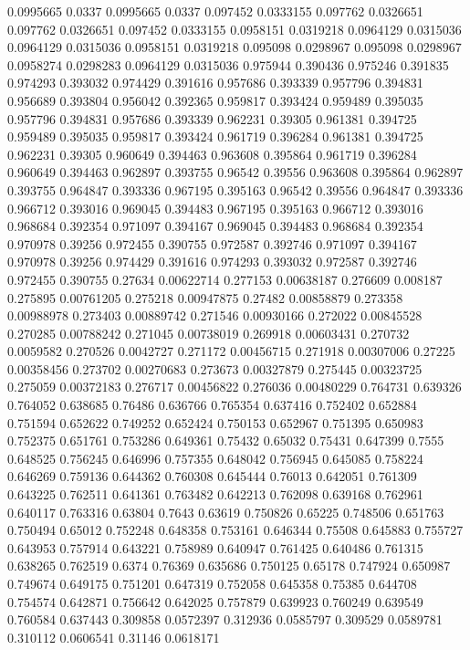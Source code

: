 0.0995665 0.0337
0.0995665 0.0337
0.097452 0.0333155
0.097762 0.0326651
0.097762 0.0326651
0.097452 0.0333155
0.0958151 0.0319218
0.0964129 0.0315036
0.0964129 0.0315036
0.0958151 0.0319218
0.095098 0.0298967
0.095098 0.0298967
0.0958274 0.0298283
0.0964129 0.0315036
0.975944 0.390436
0.975246 0.391835
0.974293 0.393032
0.974429 0.391616
0.957686 0.393339
0.957796 0.394831
0.956689 0.393804
0.956042 0.392365
0.959817 0.393424
0.959489 0.395035
0.957796 0.394831
0.957686 0.393339
0.962231 0.39305
0.961381 0.394725
0.959489 0.395035
0.959817 0.393424
0.961719 0.396284
0.961381 0.394725
0.962231 0.39305
0.960649 0.394463
0.963608 0.395864
0.961719 0.396284
0.960649 0.394463
0.962897 0.393755
0.96542 0.39556
0.963608 0.395864
0.962897 0.393755
0.964847 0.393336
0.967195 0.395163
0.96542 0.39556
0.964847 0.393336
0.966712 0.393016
0.969045 0.394483
0.967195 0.395163
0.966712 0.393016
0.968684 0.392354
0.971097 0.394167
0.969045 0.394483
0.968684 0.392354
0.970978 0.39256
0.972455 0.390755
0.972587 0.392746
0.971097 0.394167
0.970978 0.39256
0.974429 0.391616
0.974293 0.393032
0.972587 0.392746
0.972455 0.390755
0.27634 0.00622714
0.277153 0.00638187
0.276609 0.008187
0.275895 0.00761205
0.275218 0.00947875
0.27482 0.00858879
0.273358 0.00988978
0.273403 0.00889742
0.271546 0.00930166
0.272022 0.00845528
0.270285 0.00788242
0.271045 0.00738019
0.269918 0.00603431
0.270732 0.0059582
0.270526 0.0042727
0.271172 0.00456715
0.271918 0.00307006
0.27225 0.00358456
0.273702 0.00270683
0.273673 0.00327879
0.275445 0.00323725
0.275059 0.00372183
0.276717 0.00456822
0.276036 0.00480229
0.764731 0.639326
0.764052 0.638685
0.76486 0.636766
0.765354 0.637416
0.752402 0.652884
0.751594 0.652622
0.749252 0.652424
0.750153 0.652967
0.751395 0.650983
0.752375 0.651761
0.753286 0.649361
0.75432 0.65032
0.75431 0.647399
0.7555 0.648525
0.756245 0.646996
0.757355 0.648042
0.756945 0.645085
0.758224 0.646269
0.759136 0.644362
0.760308 0.645444
0.76013 0.642051
0.761309 0.643225
0.762511 0.641361
0.763482 0.642213
0.762098 0.639168
0.762961 0.640117
0.763316 0.63804
0.7643 0.63619
0.750826 0.65225
0.748506 0.651763
0.750494 0.65012
0.752248 0.648358
0.753161 0.646344
0.75508 0.645883
0.755727 0.643953
0.757914 0.643221
0.758989 0.640947
0.761425 0.640486
0.761315 0.638265
0.762519 0.6374
0.76369 0.635686
0.750125 0.65178
0.747924 0.650987
0.749674 0.649175
0.751201 0.647319
0.752058 0.645358
0.75385 0.644708
0.754574 0.642871
0.756642 0.642025
0.757879 0.639923
0.760249 0.639549
0.760584 0.637443
0.309858 0.0572397
0.312936 0.0585797
0.309529 0.0589781
0.310112 0.0606541
0.31146 0.0618171
